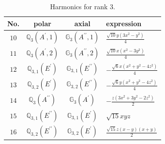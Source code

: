 \documentclass[fleqn,8pt,landscape]{jsarticle}
\begin{document}
\begin{table}[ht!]
\begin{center}
\caption{Harmonics for rank 3.}
\renewcommand{\arraystretch}{1.3}
\begin{tabular}{cccl} \hline \hline
No. & polar & axial & expression \\ \hline
$ 10 $ & $ \mathbb{Q}_{3}(A^{\prime},1) $ & $ \mathbb{G}_{3}(A^{\prime\prime},1) $ & $ \frac{\sqrt{10} y \left(3 x^{2} - y^{2}\right)}{4} $ \\
$ 11 $ & $ \mathbb{Q}_{3}(A^{\prime},2) $ & $ \mathbb{G}_{3}(A^{\prime\prime},2) $ & $ \frac{\sqrt{10} x \left(x^{2} - 3 y^{2}\right)}{4} $ \\
$ 12 $ & $ \mathbb{Q}_{3,1}(E^{\prime}) $ & $ \mathbb{G}_{3,1}(E^{\prime\prime}) $ & $ - \frac{\sqrt{6} x \left(x^{2} + y^{2} - 4 z^{2}\right)}{4} $ \\
$ 13 $ & $ \mathbb{Q}_{3,2}(E^{\prime}) $ & $ \mathbb{G}_{3,2}(E^{\prime\prime}) $ & $ - \frac{\sqrt{6} y \left(x^{2} + y^{2} - 4 z^{2}\right)}{4} $ \\
$ 14 $ & $ \mathbb{Q}_{3}(A^{\prime\prime}) $ & $ \mathbb{G}_{3}(A^{\prime}) $ & $ - \frac{z \left(3 x^{2} + 3 y^{2} - 2 z^{2}\right)}{2} $ \\
$ 15 $ & $ \mathbb{Q}_{3,1}(E^{\prime\prime}) $ & $ \mathbb{G}_{3,1}(E^{\prime}) $ & $ \sqrt{15} x y z $ \\
$ 16 $ & $ \mathbb{Q}_{3,2}(E^{\prime\prime}) $ & $ \mathbb{G}_{3,2}(E^{\prime}) $ & $ \frac{\sqrt{15} z \left(x - y\right) \left(x + y\right)}{2} $ \\
 \hline \hline
\end{tabular}
\end{center}
\end{table}
\end{document}
